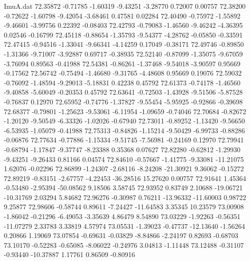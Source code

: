 \begin{filecontents}{ImuA.dat}
  72.35872   -0.71785   -1.60319   -9.43251   -3.28770    0.72007    0.00757
  72.38200   -0.72622   -1.60798   -9.42054   -3.68461    0.47581    0.02284
  72.40490   -0.75972   -1.55892   -9.46601   -3.99756    0.22392   -0.08403
  72.42793   -0.79083   -1.46560   -9.46242   -4.36395    0.02546   -0.16799
  72.45118   -0.88654   -1.35793   -9.54377   -4.28762   -0.05850   -0.33591
  72.47415   -0.94516   -1.33041   -9.66341   -4.14259    0.17049   -0.38171
  72.49746   -0.89850   -1.31366   -9.71007   -3.92887    0.69717   -0.38935
  72.52140   -0.87099   -1.35075   -9.67059   -3.76094    0.89563   -0.41988
  72.54381   -0.86261   -1.37468   -9.54018   -3.90597    0.95669   -0.17562
  72.56742   -0.75494   -1.46680   -9.31765   -4.48608    0.95669    0.19076
  72.59032   -0.76092   -1.48594   -9.29013   -5.18831    0.42238    0.45792
  72.61373   -0.74178   -1.46560   -9.40858   -5.60049   -0.20353    0.45792
  72.63641   -0.72503   -1.43928   -9.51506   -5.87528   -0.76837    0.12970
  72.65952   -0.74776   -1.37827   -9.55454   -5.95925   -0.92866   -0.39698
  72.68377   -0.79801   -1.25623   -9.53061   -6.11954   -1.09659   -0.74046
  72.70684   -0.82672   -1.20120   -9.50549   -6.33326   -1.02026   -0.67940
  72.73011   -0.89252   -1.13420   -9.56650   -6.53935   -1.05079   -0.41988
  72.75313   -0.84826   -1.15214   -9.50429   -6.99733   -0.88286   -0.06876
  72.77634   -0.77886   -1.15334   -9.51745   -7.56981   -0.24169    0.12970
  72.79941   -0.68794   -1.17847   -9.37747   -8.23388    0.35368    0.07627
  72.82280   -0.62812   -1.29930   -9.43251   -9.26433    0.81166    0.04574
  72.84610   -0.57667   -1.41775   -9.33081  -11.21075    1.62076   -0.02296
  72.86899   -1.24307   -2.68116   -8.24208  -21.30921    9.36062   -0.15272
  72.89219   -0.83151   -2.67757   -4.22453  -36.28516   15.27620    0.00757
  72.91641    1.45364   -0.53480   -2.95394  -50.08562    9.18506    3.58745
  72.93952    0.83749    2.10688  -19.06721  -10.31769    2.03294    5.84682
  72.96276   -0.30987    0.76211  -13.96332  -11.60003    0.98722    9.25877
  72.98606   -0.58744    0.89611   -7.24427  -11.64583    3.35345   10.23579
  73.00908   -1.86042   -0.21296   -6.49053   -3.35639    4.86479    8.54890
  73.03229   -1.92263   -0.56351  -11.07279    2.33783    3.33819    4.57974
  73.05531   -1.39023   -0.47737  -12.13640   -1.56264    0.20866    1.19069
  73.07854   -0.69631   -0.03829   -8.84866   -2.24197    0.82693   -0.68703
  73.10170   -0.52283   -0.65085   -8.06022   -0.24976    3.04813   -1.11448
  73.12488   -0.31107   -0.93440  -10.37887    1.17761    0.86509   -0.80916

\end{filecontents}
